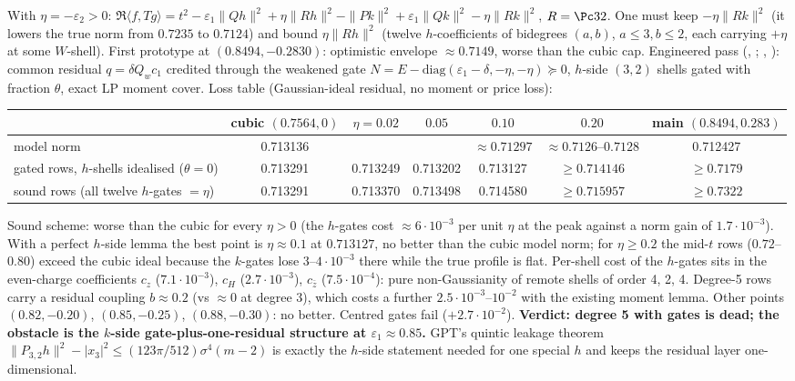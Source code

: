 \begin{negative}\label{neg:deg5}
With $\eta=-\varepsilon_2>0$: $\Re\langle f,Tg\rangle=t^2-\varepsilon_1\|Qh\|^2+\eta\|Rh\|^2-\|Pk\|^2+\varepsilon_1\|Qk\|^2-\eta\|Rk\|^2$, $R=\Pc32$. One must keep
$-\eta\|Rk\|^2$ (it lowers the true norm from $0.7235$ to $0.7124$) and bound $\eta\|Rh\|^2$ (twelve $h$-coefficients of bidegrees $(a,b)$, $a\le3,b\le2$, each
carrying $+\eta$ at some $W$-shell). First prototype at $(0.8494,-0.2830)$: optimistic envelope $\approx0.7149$, worse than the cubic cap. Engineered pass
(, ; , ): common residual $q=\delta Q_wc_1$ credited
through the weakened gate $N=E-\mathrm{diag}(\varepsilon_1-\delta,-\eta,-\eta)\succeq0$, $h$-side $(3,2)$ shells gated with fraction $\theta$, exact LP moment cover.
Loss table (Gaussian-ideal residual, no moment or price loss):
\begin{center}\scriptsize\setlength\tabcolsep{3pt}
\begin{tabular}{lcccccc}\toprule
 & cubic $(0.7564,0)$ & $\eta=0.02$ & $0.05$ & $0.10$ & $0.20$ & main $(0.8494,0.283)$\\\midrule
model norm & 0.713136 & & & $\approx0.71297$ & $\approx0.7126$--$0.7128$ & 0.712427\\
gated rows, $h$-shells idealised ($\theta=0$) & 0.713291 & 0.713249 & 0.713202 & 0.713127 & $\ge0.714146$ & $\ge0.7179$\\
sound rows (all twelve $h$-gates $=\eta$) & 0.713291 & 0.713370 & 0.713498 & 0.714580 & $\ge0.715957$ & $\ge0.7322$\\\bottomrule
\end{tabular}
\end{center}
Sound scheme: worse than the cubic for every $\eta>0$ (the $h$-gates cost $\approx6\cdot10^{-3}$ per unit $\eta$ at the peak against a norm gain of
$1.7\cdot10^{-3}$). With a perfect $h$-side lemma the best point is $\eta\approx0.1$ at $0.713127$, no better than the cubic model norm; for $\eta\ge0.2$ the
mid-$t$ rows ($0.72$--$0.80$) exceed the cubic ideal because the $k$-gates lose $3$--$4\cdot10^{-3}$ there while the true profile is flat. Per-shell cost of
the $h$-gates sits in the even-charge coefficients $c_z$ ($7.1\cdot10^{-3}$), $c_H$ ($2.7\cdot10^{-3}$), $c_{\bar z}$ ($7.5\cdot10^{-4}$): pure non-Gaussianity of
remote shells of order 4, 2, 4. Degree-5 rows carry a residual coupling $b\approx0.2$ (vs $\approx0$ at degree 3), which costs a further
$2.5\cdot10^{-3}$--$10^{-2}$ with the existing moment lemma. Other points $(0.82,-0.20)$, $(0.85,-0.25)$, $(0.88,-0.30)$: no better. Centred gates fail
($+2.7\cdot10^{-2}$). \textbf{Verdict: degree 5 with gates is dead; the obstacle is the $k$-side gate-plus-one-residual structure at $\varepsilon_1\approx0.85$.}
GPT's quintic leakage theorem $\|P_{3,2}h\|^2-|x_3|^2\le(123\pi/512)\sigma^4(m-2)$ is exactly the $h$-side statement needed for one special $h$ and keeps the
residual layer one-dimensional.
\end{negative}

